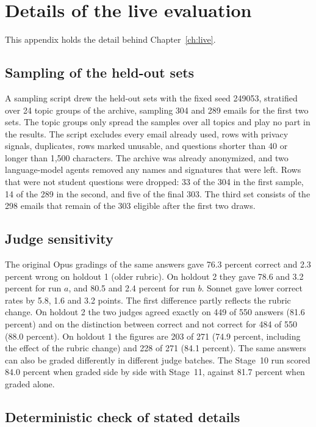 \section{Details of the live evaluation}
\label{app:live}

This appendix holds the detail behind Chapter~\ref{ch:live}.

\subsection{Sampling of the held-out sets}
\label{app:live-sampling}

A sampling script drew the held-out sets with the fixed seed 249053, stratified over 24 topic groups of the archive, sampling 304 and 289 emails for the first two sets. The topic groups only spread the samples over all topics and play no part in the results. The script excludes every email already used, rows with privacy signals, duplicates, rows marked unusable, and questions shorter than 40 or longer than 1,500 characters. The archive was already anonymized, and two language-model agents removed any names and signatures that were left. Rows that were not student questions were dropped: 33 of the 304 in the first sample, 14 of the 289 in the second, and five of the final 303. The third set consists of the 298 emails that remain of the 303 eligible after the first two draws.

\subsection{Judge sensitivity}
\label{app:live-grader}

The original Opus gradings of the same answers gave 76.3 percent correct and 2.3 percent wrong on holdout 1 (older rubric). On holdout 2 they gave 78.6 and 3.2 percent for run $a$, and 80.5 and 2.4 percent for run $b$. Sonnet gave lower correct rates by 5.8, 1.6 and 3.2 points. The first difference partly reflects the rubric change. On holdout 2 the two judges agreed exactly on 449 of 550 answers (81.6 percent) and on the distinction between correct and not correct for 484 of 550 (88.0 percent). On holdout 1 the figures are 203 of 271 (74.9 percent, including the effect of the rubric change) and 228 of 271 (84.1 percent). The same answers can also be graded differently in different judge batches. The Stage~10 run scored 84.0 percent when graded side by side with Stage~11, against 81.7 percent when graded alone.

\subsection{Deterministic check of stated details}
\label{app:live-check}

